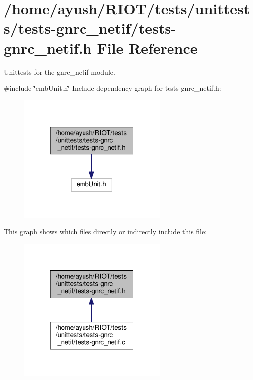 \hypertarget{tests-gnrc__netif_8h}{}\section{/home/ayush/\+R\+I\+O\+T/tests/unittests/tests-\/gnrc\+\_\+netif/tests-\/gnrc\+\_\+netif.h File Reference}
\label{tests-gnrc__netif_8h}


Unittests for the {\ttfamily gnrc\+\_\+netif} module.  


{\ttfamily \#include \char`\"{}emb\+Unit.\+h\char`\"{}}\newline
Include dependency graph for tests-\/gnrc\+\_\+netif.h\+:
\nopagebreak
\begin{figure}[H]
\begin{center}
\leavevmode
\includegraphics[width=205pt]{tests-gnrc__netif_8h__incl}
\end{center}
\end{figure}
This graph shows which files directly or indirectly include this file\+:
\nopagebreak
\begin{figure}[H]
\begin{center}
\leavevmode
\includegraphics[width=205pt]{tests-gnrc__netif_8h__dep__incl}
\end{center}
\end{figure}
